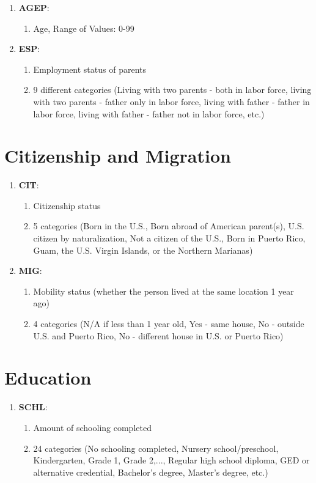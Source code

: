 \begin{enumerate}
    \item \textbf{AGEP}: 
  \begin{enumerate}
    \item Age, Range of Values: 0-99
  \end{enumerate}

    \item \textbf{ESP}: 
  \begin{enumerate}
    \item Employment status of parents
    \item 9 different categories (Living with two parents - both in labor force, living with two parents - father only in labor force, living with father - father in labor force, living with father - father not in labor force, etc.)
    \end{enumerate}

  \end{enumerate}

\section*{Citizenship and Migration}
\begin{enumerate}
  \item \textbf{CIT}:
    \begin{enumerate}
    \item Citizenship status
    \item 5 categories (Born in the U.S., Born abroad of American parent(s), U.S. citizen by naturalization, Not a citizen of the U.S., Born in Puerto Rico, Guam, the U.S. Virgin Islands, or the Northern Marianas)
  \end{enumerate}
  
  \item \textbf{MIG}:
  \begin{enumerate}
    \item Mobility status (whether the person lived at the same location 1 year ago)
    \item 4 categories (N/A if less than 1 year old, Yes - same house, No - outside U.S. and Puerto Rico, No - different house in U.S. or Puerto Rico)
  \end{enumerate}
\end{enumerate}
\section*{Education}
\begin{enumerate}
  \item \textbf{SCHL}:
  \begin{enumerate}
    \item Amount of schooling completed
    \item 24 categories (No schooling completed, Nursery school/preschool, Kindergarten, Grade 1, Grade 2,..., Regular high school diploma, GED or alternative credential, Bachelor's degree, Master's degree, etc.)
  \end{enumerate}

\end{enumerate}
